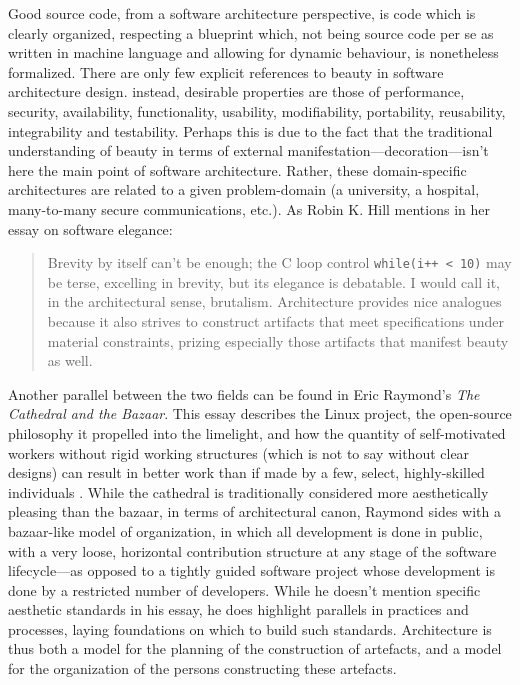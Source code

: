Good source code, from a software architecture perspective, is code which is clearly organized, respecting a blueprint which, not being source code per se as written in machine language and allowing for dynamic behaviour, is nonetheless formalized. There are only few explicit references to beauty in software architecture design. instead, desirable properties are those of performance, security, availability, functionality, usability, modifiability, portability, reusability, integrability and testability. Perhaps this is due to the fact that the traditional understanding of beauty in terms of external manifestation—decoration—isn't here the main point of software architecture. Rather, these domain-specific architectures are related to a given problem-domain (a university, a hospital, many-to-many secure communications, etc.). As Robin K. Hill mentions in her essay on software elegance:

\begin{quote}
  Brevity by itself can't be enough; the C loop control \lstinline{while(i++ < 10)} may be terse, excelling in brevity, but its elegance is debatable. I would call it, in the architectural sense, brutalism. Architecture provides nice analogues because it also strives to construct artifacts that meet specifications under material constraints, prizing especially those artifacts that manifest beauty as well. \citep{hill_what_2016}
\end{quote}

Another parallel between the two fields can be found in Eric Raymond's \emph{The Cathedral and the Bazaar}. This essay describes the Linux project, the open-source philosophy it propelled into the limelight, and how the quantity of self-motivated workers without rigid working structures (which is not to say without clear designs) can result in better work than if made by a few, select, highly-skilled individuals \citep{raymond_cathedral_2001}. While the cathedral is traditionally considered more aesthetically pleasing than the bazaar, in terms of architectural canon, Raymond sides with a bazaar-like model of organization, in which all development is done in public, with a very loose, horizontal contribution structure at any stage of the software lifecycle—as opposed to a tightly guided software project whose development is done by a restricted number of developers. While he doesn't mention specific aesthetic standards in his essay, he does highlight parallels in practices and processes, laying foundations on which to build such standards. Architecture is thus both a model for the planning of the construction of artefacts, and a model for the organization of the persons constructing these artefacts.

